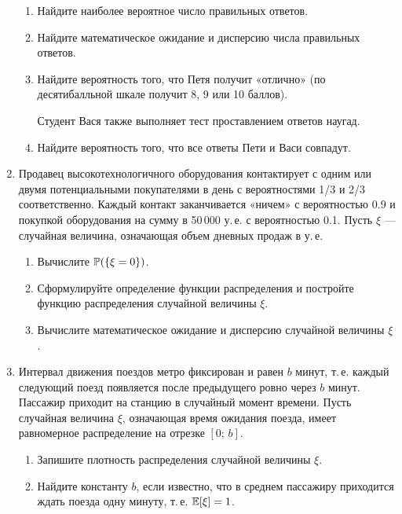 \documentclass[12pt, a4paper]{article}\usepackage[]{graphicx}\usepackage[]{color}
\begin{document}
\begin{enumerate}
\begin{enumerate}
\item	Найдите наиболее вероятное число правильных ответов.

\item	Найдите математическое ожидание и дисперсию числа правильных ответов.

\item	Найдите вероятность того, что Петя получит «отлично» (по десятибалльной шкале получит 8, 9 или 10 баллов).

Студент Вася также выполняет тест проставлением ответов наугад.

\item	Найдите вероятность того, что все ответы Пети и Васи совпадут.
\end{enumerate}

\newpage
\item  Продавец высокотехнологичного оборудования контактирует с одним или двумя потенциальными покупателями в день с вероятностями 1/3 и 2/3 соответственно. Каждый контакт заканчивается «ничем» с вероятностью 0.9 и покупкой оборудования на сумму в 50\,000 у.\,е. с вероятностью 0.1. Пусть $\xi$ — случайная величина, означающая объем дневных продаж в у.\,е.

\begin{enumerate}
\item	Вычислите  $\P(\{\xi = 0\})$.

\item	Сформулируйте определение функции распределения и постройте функцию распределения случайной величины $\xi$.

\item	Вычислите математическое ожидание и дисперсию случайной величины $\xi$.
\end{enumerate}


\item  Интервал движения поездов метро фиксирован и равен $b$ минут, т.\,е. каждый следующий поезд появляется после предыдущего ровно через $b$ минут. Пассажир приходит на станцию в случайный момент времени. Пусть случайная величина $\xi$, означающая время ожидания поезда, имеет равномерное распределение на отрезке $[0; \, b]$.

\begin{enumerate}
\item Запишите плотность распределения случайной величины $\xi$.

\item	Найдите константу $b$, если известно, что в среднем пассажиру приходится ждать поезда одну минуту, т.\,е. $\E[\xi] = 1$.


\end{enumerate}
\end{enumerate}
\end{document}
